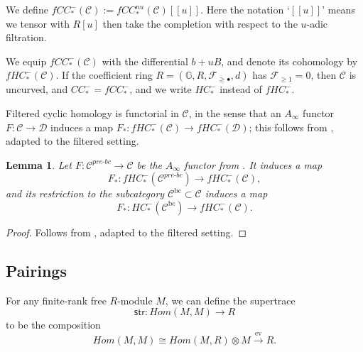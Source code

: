 \documentclass{article}
\newtheorem{lem}{Lemma}[section]
\def\G{\mathbb{G}}
\def\bc{\mathsf{bc}}
\def\G{\mathbb{G}}
\def\cF{\mathcal{F}}
\def\cC{\mathcal{C}}
\def\cD{\mathcal{D}}
\def\bc{{\operatorname{bc}}}
\def\prebc{{pre\text{-}bc}}
\begin{document}
We define $fCC_*^-(\cC) := fCC_*^{nu}(\cC)[[u]]$. 
Here the notation `$[[u]]$' means we tensor with $R[u]$ then take the completion with respect to the $u$-adic filtration. 

We equip $fCC_*^-(\cC)$ with the differential $b+uB$, and denote its cohomology by $fHC_*^-(\cC)$.  
If the coefficient ring $R = (\G,R,\cF_{\ge \bullet},d)$ has $\cF_{\ge 1} = 0$, then $\cC$ is uncurved, and $CC_*^- = fCC_*^-$, and we write $HC_*^-$ instead of $fHC_*^-$.

Filtered cyclic homology is functorial in $\cC$, in the sense that an $A_\infty$ functor $F:\cC \to \cD$ induces a map $F_*:fHC_*^-(\cC) \to fHC_*^-(\cD)$; this follows from \cite[Lemma 3.26]{Sheridan_formulae}, adapted to the filtered setting. 

\begin{lem}\label{lem:HC_C_Cbc}
    Let $F:\cC^{\prebc} \to \cC$ be the $A_\infty$ functor from \cite[Lemma 2.14]{relfukii}. 
    It induces a map
    $$F_*: fHC_*^-(\cC^{\prebc}) \to fHC_*^-(\cC),$$
    and its restriction to the subcategory $\cC^\bc \subset \cC$ induces a map
    $$F_*: HC_*^-(\cC^\bc) \to fHC_*^-(\cC).$$
\end{lem}
\begin{proof}
    Follows from \cite[Lemma 3.26]{Sheridan_formulae}, adapted to the filtered setting. 
\end{proof}


\subsection{Pairings}

For any finite-rank free $R$-module $M$, we can define the supertrace
$$\mathsf{str}: Hom(M,M) \to R$$
to be the composition
$$Hom(M,M) \cong Hom(M,R) \otimes M \xrightarrow{\mathrm{ev}} R.$$
\end{document}
